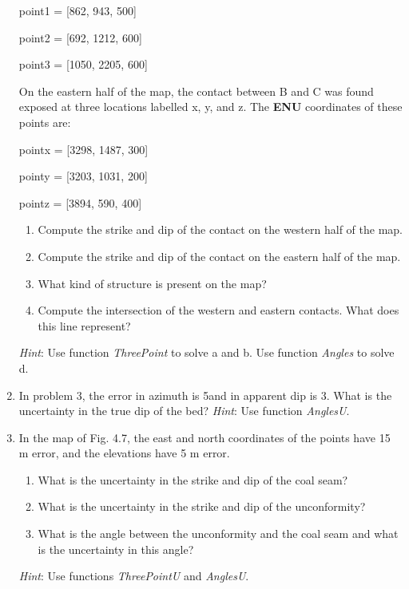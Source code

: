 \documentclass[a4paper , 12pt]{book}
\begin{document}
\begin{enumerate}
    point1 = [862, 943, 500]
    
    point2 = [692, 1212, 600]
    
    point3 = [1050, 2205, 600]
    
    On the eastern half of the map, the contact between B and C was found exposed at three locations labelled x, y, and z. The \textbf{ENU} coordinates of these points are:
    
    pointx = [3298, 1487, 300]
    
    pointy = [3203, 1031, 200]
    
    pointz = [3894, 590, 400]
    
    \begin{enumerate}
        \item Compute the strike and dip of the contact on the western half of the map.
        \item Compute the strike and dip of the contact on the eastern half of the map.
        \item What kind of structure is present on the map? 
        \item Compute the intersection of the western and eastern contacts. What does this line represent?
    \end{enumerate}
    
     \textit{Hint}: Use function \textit{ThreePoint} to solve a and b. Use function \textit{Angles} to solve d.
     
     \item In problem 3, the error in azimuth is 5\degree and in apparent dip is 3\degree. What is the uncertainty in the true dip of the bed? \textit{Hint}: Use function \textit{AnglesU}.
     
     \item In the map of Fig. 4.7, the east and north coordinates of the points have 15 m error, and the elevations have 5 m error. 
     \begin{enumerate}
        \item What is the uncertainty in the strike and dip of the coal seam?
        \item What is the uncertainty in the strike and dip of the unconformity?
        \item What is the angle between the unconformity and the coal seam and what is the uncertainty in this angle?
    \end{enumerate}
    \textit{Hint}: Use functions \textit{ThreePointU} and \textit{AnglesU}.

\end{enumerate}
\end{document}
